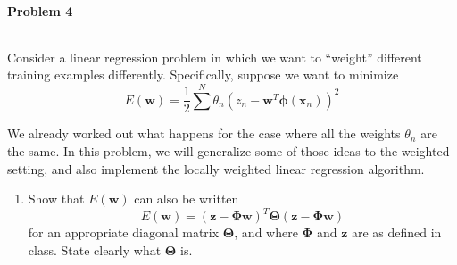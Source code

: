 \documentclass{article}
\renewcommand{\Vec}[1]{\ensuremath{\mathbf{#1}}}
\newcommand{\Mtx}[1]{\ensuremath{\mathbf{#1}}}
\begin{document}
\paragraph*{Problem 4}
$\;$ 

Consider a linear regression problem in which we want to ``weight'' 
different training examples differently. Specifically, suppose we want to minimize
\[ 
E(\Vec{w}) = \frac{1}{2}\sum^N \theta_n\left(z_n- \Vec{w}^T\Vec{\phi}(\Vec{x}_n)\right)^2 
\]

We already worked out what happens for the case where all the
weights $\theta_n$ are the same. In this problem, we will generalize some 
of those ideas to the weighted setting, and also implement the locally 
weighted linear regression algorithm.

\begin{enumerate}
\item Show that $E(\Vec{w})$ can also be written
\begin{equation} \label{Emat}
E(\Vec{w}) = (\Vec{z}-\Mtx{\Phi}\Vec{w})^{T}\Mtx{\Theta}(\Vec{z}-\Mtx{\Phi}\Vec{w}) 
\end{equation}
for an appropriate diagonal matrix $\Mtx{\Theta}$, and where $\Mtx{\Phi}$ and 
$\Vec{z}$ are as defined in class. State clearly what $\Mtx{\Theta}$ is.


\end{enumerate}
\end{document}
